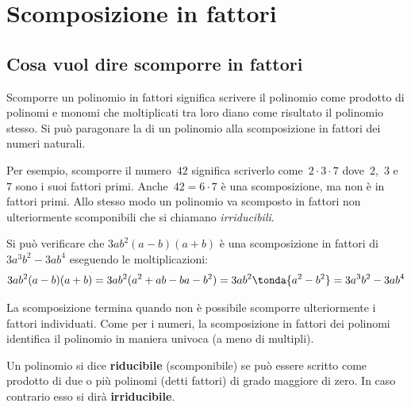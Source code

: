 
\section{Scomposizione in fattori}

\subsection{Cosa vuol dire scomporre in fattori}
\label{subsec:divpol_scomporre}

Scomporre un polinomio in fattori significa scrivere il polinomio come 
prodotto di polinomi e monomi che
moltiplicati tra loro diano come risultato il polinomio stesso. 
Si può paragonare la 
di un polinomio alla scomposizione in fattori dei numeri naturali.


Per esempio, scomporre il numero~\(42\) significa scriverlo 
come~\(2\cdot 3 \cdot 7\) dove~\(2\),~\(3\) e~\(7\) sono i suoi fattori 
primi.
Anche~\(42 = 6 \cdot 7\) è una scomposizione, ma non è in fattori primi. 
Allo stesso modo un polinomio va scomposto in fattori non ulteriormente
scomponibili che si chiamano 
\emph{irriducibili}. 

Si può verificare che \(3ab^{2}(a-b)(a+b)\) è una scomposizione in 
fattori di \(3a^{3}b^{2}-3ab^{4}\) eseguendo le moltiplicazioni:
\[3ab^{2}(a-b)(a+b)=3ab^{2}(a^{2}+ab-ba-b^{2})=
  3ab^{2}\tonda{a^{2}-b^{2}}=3a^{3}b^{2}-3ab^{4}\]

La scomposizione termina quando non è possibile scomporre ulteriormente 
i fattori individuati.
Come per i numeri, la scomposizione in fattori dei polinomi identifica 
il polinomio in maniera univoca (a meno di multipli).

\begin{definizione}{}{}
Un polinomio si dice \textbf{riducibile} (scomponibile) se può essere
scritto come prodotto di due o più polinomi (detti fattori) di grado 
maggiore di zero.
In caso contrario esso si dirà \textbf{irriducibile}.
\end{definizione}

